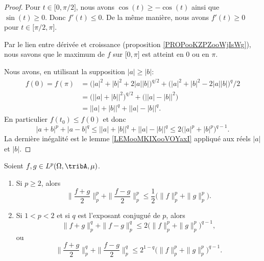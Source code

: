 \begin{proof}
		Pour \( t\in\mathopen[ 0 , \pi/2 \mathclose]\), nous avons \( \cos(t)\geq -\cos(t)\) ainsi que \( \sin(t)\geq 0\). Donc \( f'(t)\leq 0\). De la même manière, nous avons \( f'(t)\geq 0\) pour \( t\in\mathopen[ \pi/2 , \pi \mathclose]\).

		Par le lien entre dérivée et croissance (proposition \ref{PROPooKZPZooWjIsWg}), nous savons que le maximum de \( f\) sur \( \mathopen[ 0 , \pi \mathclose]\) est atteint en \( 0\) ou en \( \pi\).

		Nous avons, en utilisant la supposition \( | a |\geq | b |\):
		\begin{subequations}
			\begin{align}
				f(0)=f(\pi) & =\big( | a |^2+| b |^2+2| a | |b | \big)^{q/2}+\big( | a |^2+| b |^2-2| a | |b | \big)^q/2 \\
				            & =\big( \big| | a |+| b |\big|^2 \big)^{q/2}+\Big( \big| | a |-| b | \big|^2 \Big)          \\
				            & =\big| | a |+| b | \big|^q+\big| | a |-| b | \big|^q.
			\end{align}
		\end{subequations}
		En particulier \( f(t_0)\leq f(0)\) et donc
		\begin{equation}
			| a+b |^p+| a-b |^q\leq \big| | a |+| b | \big|^q+\big| | a |-| b | \big|^q\leq 2\big( | a |^p+| b |^p \big)^{q-1}.
		\end{equation}
		La dernière inégalité est le lemme \ref{LEMooMKIXooVOYaxI} appliqué aux réels \( | a |\) et \( | b |\).
	\end{proof}

	\begin{proposition}      \label{PROPooJDOQooWsGlkr}
		Soient \( f,g\in L^p(\Omega,\tribA,\mu)\).
		\begin{enumerate}
			\item
			      Si \( p\geq 2\), alors
			      \begin{equation}        \label{EQooBWDJooGXzdxz}
				      \| \frac{ f+g }{2} \|_p^p+\| \frac{ f-g }{2} \|_p^p\leq \frac{ 1 }{2}\Big( \| f \|_p^p+\| g \|_p^p \Big).
			      \end{equation}
			\item
			      Si \( 1<p<2\) et si \( q\) est l'exposant conjugué de \( p\), alors
			      \begin{equation}        \label{EQooXMWBooYrvaoV}
				      \| f+g \|_p^q+\| f-g \|_p^q\leq 2\Big( \| f \|_p^p +\| g \|_p^p \Big)^{q-1},
			      \end{equation}
			      ou
			      \begin{equation}        \label{EQooZCWDooBnaMom}
				      \| \frac{ f+g }{2} \|_p^q+\| \frac{ f-g }{2} \|_p^q\leq 2^{1-q}\big( \| f \|_p^p+\| g \|_p^p \big)^{q-1}.
			      \end{equation}
		\end{enumerate}
	\end{proposition}

